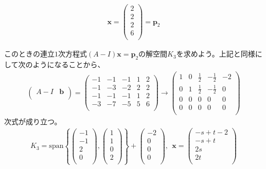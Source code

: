 \documentclass[dvipdfmx]{jsarticle}
\begin{document}
\begin{align*}
\mathbf{x} = \begin{pmatrix}
2 \\
2 \\
2 \\
6 \\
\end{pmatrix} = \mathbf{p}_{2}
\end{align*}\par
このときの連立$1$次方程式$(A - I)\mathbf{x} = \mathbf{p}_{2}$の解空間$K_{3}$を求めよう。上記と同様にして次のようになることから、
\begin{align*}
\begin{pmatrix}
A - I & \mathbf{b} \\
\end{pmatrix} = \begin{pmatrix}
 - 1 & - 1 & - 1 & 1 & 2 \\
 - 1 & - 3 & - 2 & 2 & 2 \\
 - 1 & - 1 & - 1 & 1 & 2 \\
 - 3 & - 7 & - 5 & 5 & 6 \\
\end{pmatrix} \rightarrow \begin{pmatrix}
1 & 0 & \frac{1}{2} & - \frac{1}{2} & - 2 \\
0 & 1 & \frac{1}{2} & - \frac{1}{2} & 0 \\
0 & 0 & 0 & 0 & 0 \\
0 & 0 & 0 & 0 & 0 \\
\end{pmatrix}
\end{align*}
次式が成り立つ。
\begin{align*}
K_{3} = {\mathrm{span}}\left\{ \begin{pmatrix}
 - 1 \\
 - 1 \\
2 \\
0 \\
\end{pmatrix},\begin{pmatrix}
1 \\
1 \\
0 \\
2 \\
\end{pmatrix} \right\} + \begin{pmatrix}
 - 2 \\
0 \\
0 \\
0 \\
\end{pmatrix},\ \ \mathbf{x} = \begin{pmatrix}
 - s + t - 2 \\
 - s + t \\
2s \\
2t \\
\end{pmatrix}
\end{align*}
\end{document}

